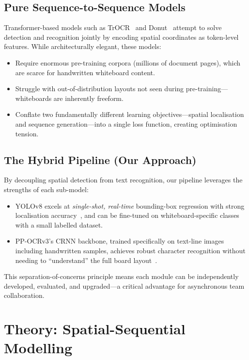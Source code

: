 \documentclass[11pt, a4paper]{article}
\begin{document}
\subsection{Pure Sequence-to-Sequence Models}
Transformer-based models such as TrOCR~\cite{li2023trocr} and Donut~\cite{kim2022donut} attempt to solve detection and recognition jointly by encoding spatial coordinates as token-level features. While architecturally elegant, these models:
\begin{itemize}
  \item Require enormous pre-training corpora (millions of document pages), which are scarce for handwritten whiteboard content.
  \item Struggle with out-of-distribution layouts not seen during pre-training—whiteboards are inherently freeform.
  \item Conflate two fundamentally different learning objectives—spatial localisation and sequence generation—into a single loss function, creating optimisation tension.
\end{itemize}

\subsection{The Hybrid Pipeline (Our Approach)}
By decoupling spatial detection from text recognition, our pipeline leverages the strengths of each sub-model:
\begin{itemize}
  \item YOLOv8 excels at \emph{single-shot, real-time} bounding-box regression with strong localisation accuracy~\cite{redmon2016yolo, jocher2023yolov8}, and can be fine-tuned on whiteboard-specific classes with a small labelled dataset.
  \item PP-OCRv3's CRNN backbone, trained specifically on text-line images including handwritten samples, achieves robust character recognition without needing to ``understand'' the full board layout~\cite{du2022ppocr}.
\end{itemize}

This separation-of-concerns principle means each module can be independently developed, evaluated, and upgraded—a critical advantage for asynchronous team collaboration.


\section{Theory: Spatial-Sequential Modelling}\label{sec:theory}
\end{document}

